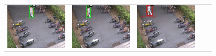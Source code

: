 \begin{frame}
\begin{figure}[t]
\begin{tabular}{ccccc}
            \includegraphics[scale=0.17]{figures/case-3-suspicious-0197} &
            \includegraphics[scale=0.17]{figures/case-3-suspicious-0233} &
            \includegraphics[scale=0.17]{figures/case-3-suspicious-0246} &

\end{tabular}
\end{figure}
\end{frame}
